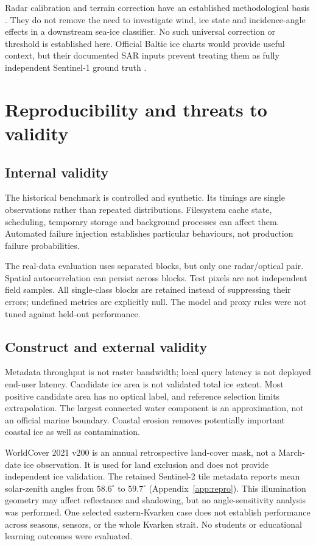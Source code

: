 Radar calibration and terrain correction have an established methodological basis
\citep{small2011,pc-s1-rtc}. They do not remove the need to investigate wind, ice state and
incidence-angle effects in a downstream sea-ice classifier. No such universal correction
or threshold is established here. Official Baltic ice charts would provide useful context,
but their documented SAR inputs prevent treating them as fully independent Sentinel-1
ground truth \citep{cmems-ice-pum}.

\section{Reproducibility and threats to validity}

\subsection{Internal validity}

The historical benchmark is controlled and synthetic. Its timings are single observations
rather than repeated distributions. Filesystem cache state, scheduling, temporary storage
and background processes can affect them. Automated failure injection establishes particular
behaviours, not production failure probabilities.

The real-data evaluation uses separated blocks, but only one radar/optical pair. Spatial
autocorrelation can persist across blocks. Test pixels are not independent field samples.
All single-class blocks are retained instead of suppressing their errors; undefined metrics
are explicitly null. The model and proxy rules were not tuned against held-out performance.

\subsection{Construct and external validity}

Metadata throughput is not raster bandwidth; local query latency is not deployed end-user
latency. Candidate ice area is not validated total ice extent. Most positive candidate area
has no optical label, and reference selection limits extrapolation. The largest connected
water component is an approximation, not an official marine boundary. Coastal erosion
removes potentially important coastal ice as well as contamination.

WorldCover 2021 v200 is an annual retrospective land-cover mask, not a March-date ice
observation. It is used for land exclusion and does not provide independent ice validation.
The retained Sentinel-2 tile metadata reports mean solar-zenith angles from
$58.6^\circ$ to $59.7^\circ$ (Appendix~\ref{app:repro}). This illumination geometry may affect
reflectance and shadowing, but no angle-sensitivity analysis was performed.
One selected eastern-Kvarken case does not establish performance across seasons, sensors,
or the whole Kvarken strait. No students or educational learning outcomes were evaluated.

